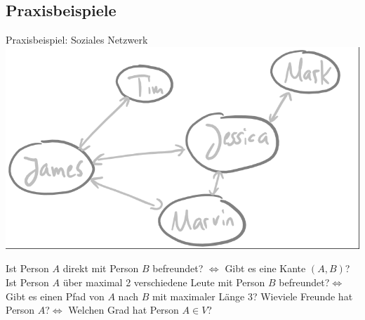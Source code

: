 \subsection{Praxisbeispiele}

\begin{frame}{Praxisbeispiel: Soziales Netzwerk}
	\ip\includegraphics[scale=0.4]{images/graph_beispiel_socialnetwork.png}
	\begin{itemize}
		\pitem Ist Person $A$ direkt mit Person $B$ befreundet? \pause $\Leftrightarrow$ Gibt es eine Kante $(A,B)$?
		\pitem Ist Person $A$ über maximal 2 verschiedene Leute mit Person $B$ befreundet?\pause $\Leftrightarrow$  Gibt es einen Pfad von $A$ nach $B$ mit maximaler Länge 3?
		\pitem Wieviele Freunde hat Person $A$?\pause $\Leftrightarrow$ Welchen Grad hat Person $A \in V$?
	\end{itemize}
\end{frame}

